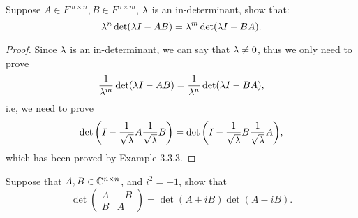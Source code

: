 \begin{pro}%
	Suppose $A\in F^{m\times n},B\in F^{n\times m}$, $\lambda$ is an in-determinant, show that:
	\[\lambda^{n}\det(\lambda I-AB)=\lambda^{m}\det(\lambda I-BA).\]
\end{pro}
\begin{proof}
	Since $\lambda$ is an in-determinant, we can say that $\lambda\neq 0$, thus we only need to prove
	\[\frac{1}{\lambda^m} \det(\lambda I-AB)=\frac{1}{\lambda^n} \det(\lambda I-BA),\]
	i.e, we need to prove
	\[\det\bigg(I-\frac{1}{\sqrt{\lambda}} A \frac{1}{\sqrt{\lambda}}B\bigg)=\det\bigg(I-\frac{1}{\sqrt{\lambda}}B \frac{1}{\sqrt{\lambda}}A\bigg),\]
	which has been proved by Example $3.3.3$.
\end{proof}

\begin{pro}%
	Suppose that $A,B\in\mathbb{C}^{n\times n}$, and $i^2=-1$, show that
	\[\det\begin{pmatrix} A&-B\\B&A\end{pmatrix}=\det(A+iB)\det(A-iB).\]
\end{pro}
